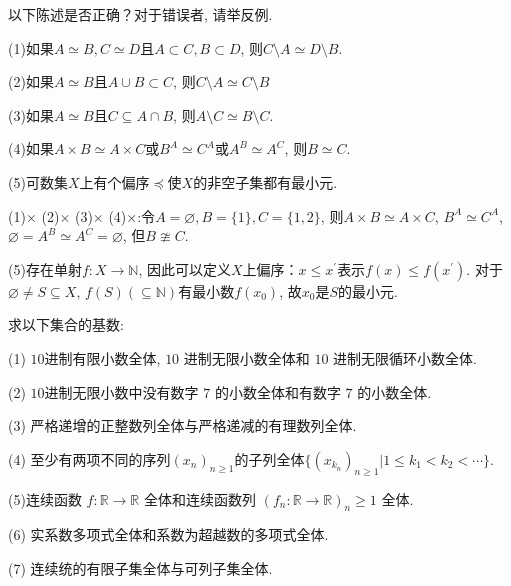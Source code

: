 \begin{4}
以下陈述是否正确？对于错误者, 请举反例.

(1)如果$A\simeq B, C\simeq D$且$A\subset C, B\subset D$, 则$C\setminus A\simeq D\setminus B.$

(2)如果$A\simeq B$且$A\cup B\subset C$, 则$C\setminus A\simeq C\setminus B$

(3)如果$A\simeq B$且$C\subseteq A\cap B$, 则$A\setminus C\simeq B\setminus C.$

(4)如果$A\times B\simeq A\times C$或$B^A\simeq C^A$或$A^B\simeq A^C$, 则$B\simeq C.$

(5)可数集$X$上有个偏序$\preceq$使$X$的非空子集都有最小元.
   \end{4}
\begin{solution}
(1)$\times$
(2)$\times$
(3)$\times$
(4)$\times$:令$A=\varnothing, B=\{1\}, C=\{1, 2\}$, 
则$A\times B\simeq A\times C$, $B^{A}\simeq  C^{A}$, 
$\varnothing =A^{B}\simeq A^{C}=\varnothing$, 但$B\ncong  C$.

(5)存在单射$f:X\rightarrow \mathbb{N}$, 因此可以定义$X$上偏序：$x\leq x^{\prime}$表示$f(x)\leq f(x^{\prime})$. 
对于$\varnothing\neq S\subseteq X$, $f(S)(\subseteq \mathbb{N})$有最小数$f(x_0)$, 故$x_0$是$S$的最小元.
\end{solution}

\begin{5}
求以下集合的基数:

(1) $10$进制有限小数全体, $10$ 进制无限小数全体和 $10$ 进制无限循环小数全体.

(2) $10$进制无限小数中没有数字 $7$ 的小数全体和有数字 $7$ 的小数全体.

(3) 严格递增的正整数列全体与严格递减的有理数列全体.

(4) 至少有两项不同的序列$(x_n)_{n\geqslant1}$的子列全体$\{(x_{k_n})_{n\geqslant1}|1\leqslant k_1<k_2<\cdots\}.$

(5)连续函数 $f:\mathbb{R}\to\mathbb{R}$ 全体和连续函数列 $(f_n:\mathbb{R}\to\mathbb{R})_n\geqslant1$ 全体.

(6) 实系数多项式全体和系数为超越数的多项式全体.

(7) 连续统的有限子集全体与可列子集全体.
\end{5}

